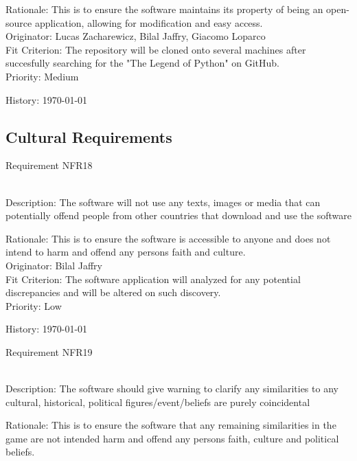 \documentclass[12pt, titlepage]{article}
\begin{document}
\begin{enumerate}
{\color{blue}Rationale: This is to ensure the software maintains its property of being an open-source application, allowing for modification and easy access.}\\

{\color{blue}Originator:  Lucas Zacharewicz, Bilal Jaffry, Giacomo Loparco}\\

{\color{blue}Fit Criterion: The repository will be cloned onto several machines after succesfully searching for the "The Legend of Python" on GitHub.}\\
 
{\color{blue}Priority: Medium}
  
{\color{blue}History: \today}

\subsection{Cultural Requirements}

{\color{blue}\item Requirement NFR18}\\
{\color{blue}Description: } The software will not use any texts, images or media that can potentially offend people from other countries that download and use the software

{\color{blue}Rationale: This is to ensure the software is accessible to anyone and does not intend to harm and offend any persons faith and culture.}\\

{\color{blue}Originator: Bilal Jaffry}\\

{\color{blue}Fit Criterion: The software application will analyzed for any potential discrepancies and will be altered on such discovery. }\\
 
{\color{blue}Priority: Low}
  
{\color{blue}History: \today}

{\color{blue}\item Requirement NFR19}\\
{\color{blue}Description: } The software should give warning to clarify any similarities to any cultural, historical, political figures/event/beliefs are purely coincidental

{\color{blue}Rationale: This is to ensure the software that any remaining similarities in the game are not intended harm and offend any persons faith, culture and political beliefs.}\\


\end{enumerate}
\end{document}
